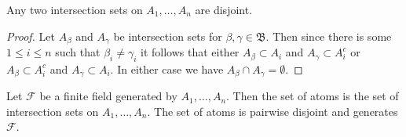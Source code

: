 \begin{prop}Any two intersection sets on $A_1, \dotsc, A_n$ are disjoint.
\end{prop}
\begin{proof}
Let $A_\beta$ and $A_\gamma$ be intersection sets for $\beta, \gamma \in \mathfrak{B}$.  Then since there is some $1 \leq i \leq n$ such that $\beta_i \neq \gamma_i$ it follows that either $A_\beta \subset A_i$ and $A_\gamma \subset A_i^c$ or $A_\beta \subset A_i^c$ and $A_\gamma \subset A_i$.  In either case we have $A_\beta \cap A_\gamma = \emptyset$. 
\end{proof}

\begin{prop}\label{AtomsAsIntersectionSets}Let $\mathcal{F}$ be a finite field  generated by $A_1, \dotsc, A_n$.  Then the set of atoms is the set of intersection sets on $A_1, \dotsc, A_n$.  The set of atoms is pairwise disjoint and generates $\mathcal{F}$.  
\end{prop}
